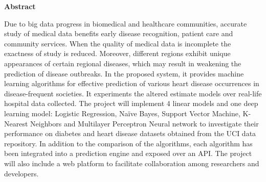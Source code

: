\documentclass{book}
\author{akshat}
\date{2020}
\begin{document}
    \setlength\columnsep{20pt}
    \setlength{\columnseprule}{1pt}

    \begin{center}
        \LARGE
        \textbf{Abstract}\\
    \end{center}

	\begin{doublespace}
		\normalsize
	Due to big data progress in biomedical and healthcare communities, accurate study of medical data benefits early disease recognition, patient care and community services. When the quality of medical data is incomplete the exactness of study is reduced. Moreover, different regions exhibit unique appearances of certain regional diseases, which may result in weakening the prediction of disease outbreaks. In the proposed system, it provides machine learning algorithms for effective prediction of various heart disease occurrences in disease-frequent societies. It experiments the altered estimate models over real-life hospital data collected.
	The project will implement 4 linear models and one deep learning model: Logistic Regression, Naïve Bayes, Support Vector Machine, K-Nearest Neighbors and Multilayer Perceptron Neural network  to investigate their performance on diabetes and heart disease datasets obtained from the UCI data repository. 
	In addition to the comparison of the algorithms, each algorithm has been integrated into a prediction engine and exposed over an API. The project will also include a web platform to facilitate collaboration among researchers and developers.
	\end{doublespace}
	
\end{document}
